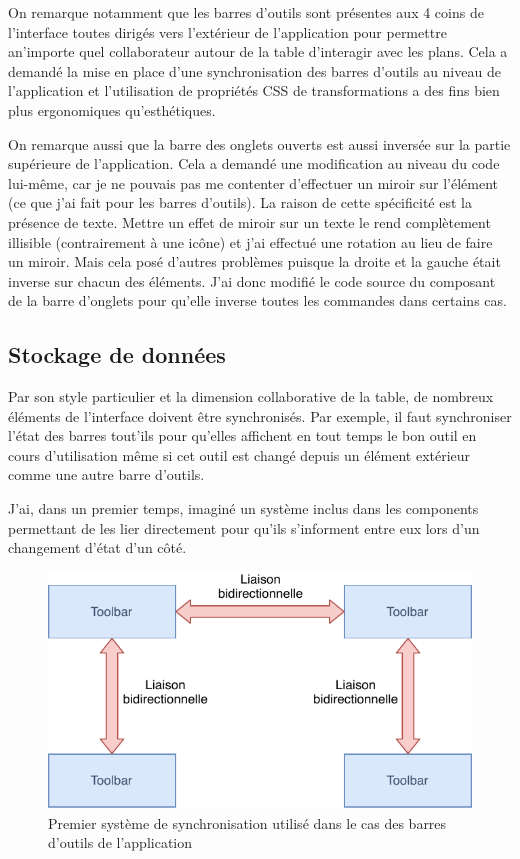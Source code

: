 On remarque notamment que les barres d'outils sont présentes aux 4 coins de l'interface toutes dirigés vers l'extérieur de l'application pour permettre an'importe quel collaborateur autour de la table d'interagir avec les plans.
Cela a demandé la mise en place d'une synchronisation des barres d'outils au niveau de l'application et l'utilisation de propriétés CSS de transformations a des fins bien plus ergonomiques qu'esthétiques.

\bigskip

On remarque aussi que la barre des onglets ouverts est aussi inversée sur la partie supérieure de l'application.
Cela a demandé une modification au niveau du code lui-même, car je ne pouvais pas me contenter d'effectuer un miroir sur l'élément (ce que j'ai fait pour les barres d'outils).
La raison de cette spécificité est la présence de texte.
Mettre un effet de miroir sur un texte le rend complètement illisible (contrairement à une icône) et j'ai effectué une rotation au lieu de faire un miroir.
Mais cela posé d'autres problèmes puisque la droite et la gauche était inverse sur chacun des éléments.
J'ai donc modifié le code source du composant de la barre d'onglets pour qu'elle inverse toutes les commandes dans certains cas.

\subsection{Stockage de données}
\label{eiffageTablePlanStores}

Par son style particulier et la dimension collaborative de la table, de nombreux éléments de l'interface doivent être synchronisés.
Par exemple, il faut synchroniser l'état des barres tout'ils pour qu'elles affichent en tout temps le bon outil en cours d'utilisation même si cet outil est changé depuis un élément extérieur comme une autre barre d'outils.

J'ai, dans un premier temps, imaginé un système inclus dans les components permettant de les lier directement pour qu'ils s'informent entre eux lors d'un changement d'état d'un côté.

\begin{figure}[h]
    \centering
    \includegraphics[scale=1]{img/premiere-synchro.pdf}
    \caption{Premier système de synchronisation utilisé dans le cas des barres d'outils de l'application}
\end{figure}

